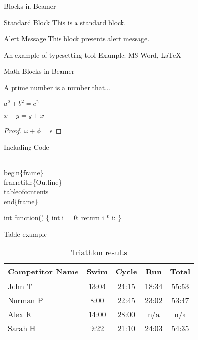 \documentclass{beamer}
\begin{document}
\begin{frame}{Blocks in Beamer}
    \begin{block}{Standard Block}
        This is a standard block.
    \end{block}
    \begin{alertblock}{Alert Message}
        This block presents alert message.
    \end{alertblock}
    \begin{exampleblock}{An example of typesetting tool}
        Example: MS Word, \LaTeX{}
    \end{exampleblock}
\end{frame}

\begin{frame}{Math Blocks in Beamer}
    \begin{definition}
        A prime number is a number that...
    \end{definition}
    \begin{theorem}[Pythagoras]
        $a^2 + b^2 = c^2$
    \end{theorem}
    \begin{corollary}
        $x + y = y + x  $
    \end{corollary}
    \begin{proof}
        $\omega +\phi = \epsilon$
    \end{proof}
\end{frame} 

\begin{frame}[fragile]{Including Code}
    \begin{semiverbatim}
        \\begin\{frame\}
        \\frametitle\{Outline\}
        \\tableofcontents
        \\end\{frame\}
    \end{semiverbatim}
    \begin{semiverbatim}
        int function() \{
            int i = 0;
            return i * i;
        \}
    \end{semiverbatim}
\end{frame}

\begin{frame}{Table example}
    \begin{table}
        \begin{tabular}{l | c | c | c | c }
        Competitor Name & Swim & Cycle & Run & Total \\
        \hline \hline
        John T & 13:04 & 24:15 & 18:34 & 55:53 \\
        Norman P & 8:00 & 22:45 & 23:02 & 53:47\\
        Alex K & 14:00 & 28:00 & n/a & n/a\\
        Sarah H & 9:22 & 21:10 & 24:03 & 54:35
        \end{tabular}
        \caption{Triathlon results}
    \end{table}
\end{frame} 
\end{document}

